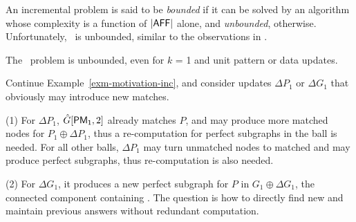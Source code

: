 An incremental problem is said to be {\em bounded} if it can be solved by an algorithm whose complexity is a function of $|{\mathsf{AFF}}|$ alone, and {\em unbounded}, otherwise.
Unfortunately, \dynteamF\, is unbounded, similar to the observations in \cite{FanLMTWW10,FanWW13-tods}.


\begin{prop}
\label{thm-inc-grouprec-pat}
The \dynteamF\, problem is unbounded, even for $k$ = 1 and unit pattern or data updates.
\end{prop}



\begin{example}
\label{exm-pattern-challenge}
Continue Example~\ref{exm-motivation-inc}, and consider updates $\Delta P_1$ or $\Delta G_1$ that obviously may introduce new matches.

\sstab
(1) For $\Delta P_1$, $\hat{G}{[{\mathsf{PM_1}}, 2]}$ already matches $P$, and may produce more matched nodes for $P_1\oplus \Delta P_1$,
thus a re-computation for perfect subgraphs in the ball is needed.
For all other balls, $\Delta P_1$ may turn unmatched nodes to matched and may produce perfect subgraphs,
thus re-computation is also needed.

\sstab
(2) For $\Delta G_1$, it produces a new perfect subgraph for $P$ in $G_1\oplus\Delta G_1$,
\ie the connected component containing .
The question is how to directly find new and maintain previous answers without redundant computation.
\end{example}



